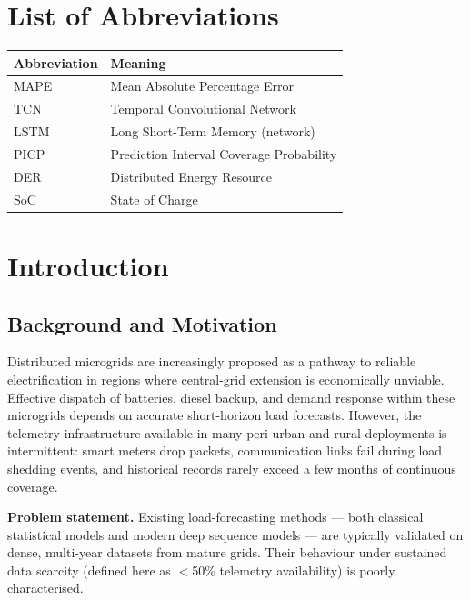 \documentclass[12pt,a4paper]{report}
\begin{document}
\chapter*{List of Abbreviations}
\begin{tabularx}{\linewidth}{@{}lX@{}}
\toprule
\textbf{Abbreviation} & \textbf{Meaning} \\
\midrule
MAPE & Mean Absolute Percentage Error \\
TCN & Temporal Convolutional Network \\
LSTM & Long Short-Term Memory (network) \\
PICP & Prediction Interval Coverage Probability \\
DER & Distributed Energy Resource \\
SoC & State of Charge \\
\bottomrule
\end{tabularx}

\chapter{Introduction}

\section{Background and Motivation}
Distributed microgrids are increasingly proposed as a pathway to reliable electrification in
regions where central-grid extension is economically unviable. Effective dispatch of
batteries, diesel backup, and demand response within these microgrids depends on accurate
short-horizon load forecasts. However, the telemetry infrastructure available in many
peri-urban and rural deployments is intermittent: smart meters drop packets, communication
links fail during load shedding events, and historical records rarely exceed a few months of
continuous coverage.

\begin{notebox}
\textbf{Problem statement.} Existing load-forecasting methods --- both classical statistical
models and modern deep sequence models --- are typically validated on dense, multi-year
datasets from mature grids. Their behaviour under sustained data scarcity (defined here as
$<$50\% telemetry availability) is poorly characterised.
\end{notebox}
\end{document}
